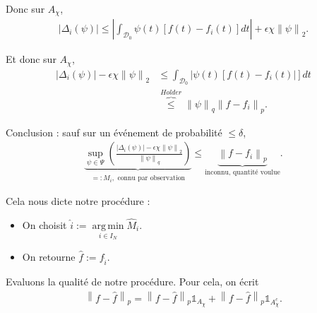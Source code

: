\documentclass[11pt,letterpaper]{article}
\DeclareMathOperator*{\argmin}{arg\,min}
\begin{document}
\par Donc sur $A_\chi$, 
\begin{equation}
	\begin{split}
		\left| \Delta_i \left( \psi \right) \right| \leq \left| \int_{\mathcal{D}_0}^{} \psi \left( t \right) \left[ f \left( t \right) - f_i \left( t \right) \right] dt \right| + \epsilon \chi \left\| \psi \right\|_2 .
	\end{split}
\end{equation}

\par Et donc sur $A_\chi$, 
\begin{equation}
	\begin{split}
		\left| \Delta_i \left( \psi \right) \right| - \epsilon \chi \left\| \psi \right\|_2 & \leq \int_{\mathcal{D}_0}^{} \left| \psi \left( t \right) \left[ f \left( t \right) - f_i \left( t \right) \right| \right] dt \\
		& \overbrace{\leq}^{Holder} \left\| \psi \right\|_q \left\| f - f_i \right\|_p .
	\end{split}
\end{equation}

\par Conclusion : sauf sur un événement de probabilité $\leq \delta$, 
\begin{equation}
	\begin{split}
		\underbrace{\sup\limits_{\psi \in \Psi} \left( \frac{\left| \Delta_i \left( \psi \right) \right| - \epsilon \chi \left\| \psi \right\|_2}{\left\| \psi \right\|_q} \right)}_{=: \hat{M}_i, \text{ connu par observation}} \leq \underbrace{\left\| f - f_i \right\|_p}_{\text{inconnu, quantité voulue}} .
	\end{split}
\end{equation}

\par Cela nous dicte notre procédure :
\begin{itemize}
\item On choisit $\hat{i} := \argmin\limits_{i \in I_N} \hat{M}_i$.
\item On retourne $\hat{f} := f_{\hat{i}}$.
\end{itemize}

\par Evaluons la qualité de notre procédure. Pour cela, on écrit
\begin{equation}
	\begin{split}
		\left\| f - \hat{f} \right\|_p = \left\| f - \hat{f} \right\|_p \mathds{1}_{A_\chi} + \left\| f - \hat{f} \right\|_p \mathds{1}_{A_\chi^c} .
	\end{split}
\end{equation}
\end{document}
